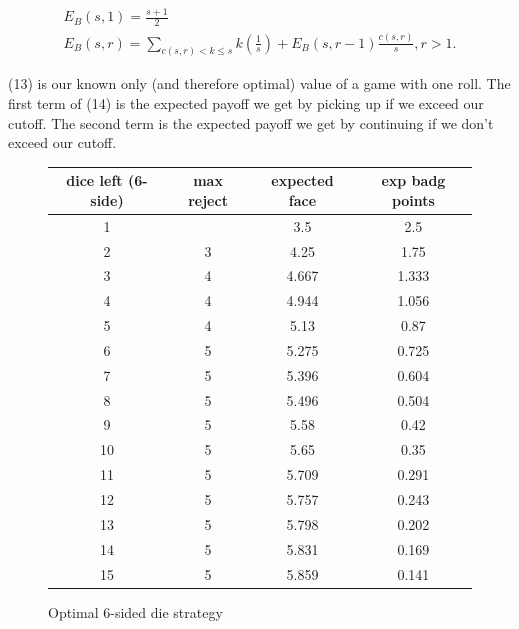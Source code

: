 \documentclass[11pt, oneside]{article} 	%
\begin{document}
\begin{align}
E_B(s, 1) = \frac{s+1}{2} \\
E_B(s, r) = \sum_{c(s,r) < k \leq s} k(\frac{1}{s}) + E_B(s, r-1)\frac{c(s,r)}{s}, r > 1.
\end{align}

(13) is our known only (and therefore optimal) value of a game with one roll.
The first term of (14) is the expected payoff we get by picking up if we exceed our cutoff. The second term is the expected payoff we get by continuing if we don't exceed our cutoff.

\begin{figure}[!htb]
\centering
\begin{tabular}{c | c c c}
dice left (6-side) & max reject & expected face & exp badg points \\
\hline
1 &  & 3.5 & 2.5 \\
2 & \cellcolor{cyan} 3 & 4.25 & 1.75 \\
3 & 4 & 4.667 & 1.333 \\
4 & 4 & 4.944 & 1.056 \\
5 & \cellcolor{cyan} 4 & 5.13 & 0.87 \\
6 & 5 & 5.275 & 0.725 \\
7 & 5 & 5.396 & 0.604 \\
8 & 5 & 5.496 & 0.504 \\
9 & 5 & 5.58 & 0.42 \\
10 & 5 & 5.65 & 0.35 \\
11 & 5 & 5.709 & 0.291 \\
12 & 5 & 5.757 & 0.243 \\
13 & 5 & 5.798 & 0.202 \\
14 & 5 & 5.831 & 0.169 \\
15 & 5 & 5.859 & 0.141 \\
\end{tabular}
\caption{Optimal 6-sided die strategy}
\label{fig:optimal6}
\end{figure}
\end{document}
